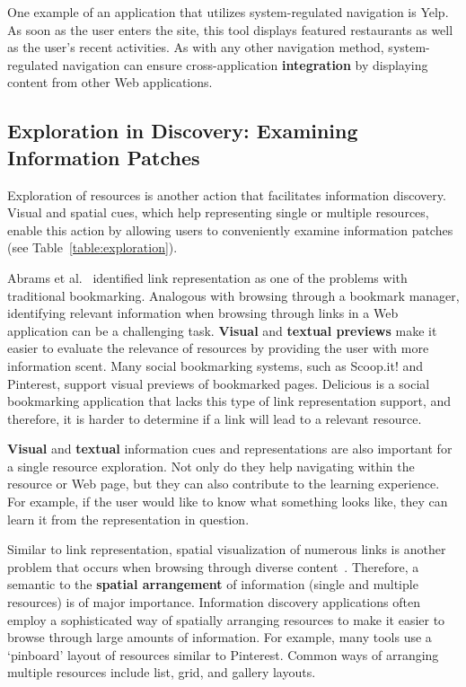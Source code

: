 {{{One example of an application that utilizes system-regulated navigation is Yelp. As soon as the user enters the site, this tool displays featured restaurants as well as the user's recent activities. As with any other navigation method, system-regulated navigation can ensure cross-application \textbf{integration} by displaying content from other Web applications. 
} %
} %


{\subsection{Exploration in Discovery: Examining Information Patches}
Exploration of resources is another action that facilitates information discovery. Visual and spatial cues, which help representing single or multiple resources, enable this action by allowing users to conveniently examine information patches (see Table~\ref{table:exploration}). 


Abrams et al.~\cite{abrams1998information} identified link representation as one of the problems with traditional bookmarking. Analogous with browsing through a bookmark manager, identifying relevant information when browsing through links in a Web application can be a challenging task. \textbf{Visual} and \textbf{textual previews} make it easier to evaluate the relevance of resources by providing the user with more information scent. Many social bookmarking systems, such as Scoop.it! and Pinterest, support visual previews of bookmarked pages. Delicious is a social bookmarking application that lacks this type of link representation support, and therefore, it is harder to determine if a link will lead to a relevant resource.

\textbf{Visual} and \textbf{textual} information cues and representations are also important for a single resource exploration. Not only do they help navigating within the resource or Web page, but they can also contribute to the learning experience. For example, if the user would like to know what something looks like, they can learn it from the representation in question.  

Similar to link representation, spatial visualization of numerous links is another problem that occurs when browsing through diverse content~\cite{abrams1998information}. Therefore, a semantic to the \textbf{spatial arrangement} of information (single and multiple resources) is of major importance. Information discovery applications often employ a sophisticated way of spatially arranging resources to make it easier to browse through large amounts of information. For example, many tools use a `pinboard' layout of resources similar to Pinterest. Common ways of arranging multiple resources include list, grid, and gallery layouts. 

}}
